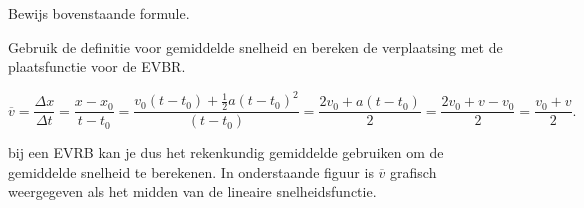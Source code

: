 \documentclass{ximera}
\begin{document}
\begin{exercise}
Bewijs bovenstaande formule. 

\begin{hint}
Gebruik de definitie voor gemiddelde snelheid en bereken de verplaatsing met de plaatsfunctie voor de EVBR. 
\end{hint}

\begin{oplossing}
	\[
	\overline{v}=\frac{\Delta x}{\Delta t}=\frac{x-x_0}{t-t_0} = \frac{v_0(t-t_0)+\frac{1}{2}a(t-t_0)^2}{(t-t_0)} = \frac{2v_0+a(t-t_0)}{2} = \frac{2v_0 + v - v_0}{2} = \frac{v_0+v}{2}.
	\]
		
	bij een EVRB kan je dus het rekenkundig gemiddelde gebruiken om de gemiddelde snelheid te berekenen. 
	In onderstaande figuur is \(\overline{v}\) grafisch weergegeven als het midden van de lineaire snelheidsfunctie. 

	\begin{image}
	\end{image}

\end{oplossing}

	
\end{exercise}
\end{document}
